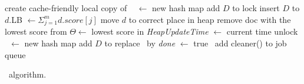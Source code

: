\begin{algorithm*}[htb]
\begin{multicols}{2}
\begin{algorithmic}[1]
        			\Comment create cache-friendly local copy of \DMap\ %
        			\State \TMap[i] $\leftarrow$ new hash map
            			\State add $D$ to \TMap[i] \label{l:hash-chash}
            		\EndFor
\EndProcedure
\Statex 
{} 
\State lock \DHeap \label{l:lock-heap}
	\State insert $D$ to \DHeap
	  \label{l:for-all-heap-docs}
		\State $d$.LB $\leftarrow \Sigma_{j=1}^{m} d.score[j]$
		\State move $d$ to correct place in heap \label{l:fix-heap}
	\EndFor
		\State remove doc with the lowest score from \DHeap
	\EndIf
		\State  $\Theta \leftarrow$ lowest score in \DHeap
	\EndIf
	\State \emph{HeapUpdateTime} $\leftarrow$ current time 
\EndIf
\State unlock \DHeap  \label{l:unlock-heap}
\EndProcedure
%
%
\Statex 
{} \label{l:clean-start}
\If{$|\DMap | > \Phi $} 
\State \LDMap\ $\leftarrow$ new hash map \label{l:clean-local-copy}
{} 
	\State add   $D$ to \LDMap
\EndIf
\EndFor
\State replace \DMap\ by \LDMap \label{l:clean-replace}
\EndIf
 \label{l:clean-stop-cond}
\State \emph{done} $\leftarrow$ true
\Else\ add {\sc cleaner()} to job queue
\EndIf
\label{l:clean-end}
\EndProcedure 
\end{algorithmic}
\end{multicols}
\caption{\alg\ algorithm.}
\label{alg:sparta}
\end{algorithm*}
